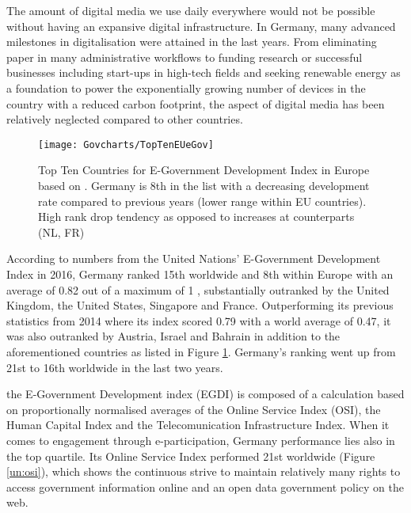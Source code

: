 The amount of digital media we use daily everywhere would not be possible without having an expansive digital infrastructure.
In Germany, many advanced milestones in digitalisation were attained in the last years. From eliminating paper in many administrative workflows 
to funding research or successful businesses including start-ups in high-tech fields %
and seeking renewable energy as a foundation %
to power the exponentially growing number of devices in the country with a reduced carbon footprint, the aspect of digital media has been relatively neglected compared to other countries. 


\begin{figure}[H]
	\caption[E-Government Development Index in Europe]{Top Ten Countries for E-Government Development Index in Europe based on \cite{un:egovReport}. Germany is 8th in the list with a decreasing development rate compared to previous years (lower range within EU countries). High rank drop tendency as opposed to increases at counterparts (NL, FR)} %
	\label{un:egci}
	\texttt{[image: Govcharts/TopTenEUeGov]} 
\end{figure}

According to numbers from the United Nations' E-Government Development Index in 2016, Germany ranked 15th worldwide and 8th within Europe with an average of 0.82 out of a maximum of 1 %
, substantially outranked by the United Kingdom, the United States, Singapore and France. Outperforming its previous statistics from 2014 where its index scored  0.79 with a world average of 0.47, it was also outranked by Austria, Israel and Bahrain \cite{freiheit:digitalisierung} in addition to the aforementioned countries as listed in Figure \ref{un:egci}.  Germany's ranking went up from 21st to 16th worldwide in the last two years.



the E-Government Development index (EGDI) is composed of a calculation based on proportionally normalised averages of the Online Service Index (OSI), the Human Capital Index and the Telecomunication Infrastructure Index. 
When it comes to engagement through e-participation, Germany performance lies also in the top quartile. Its Online Service Index performed 21st worldwide (Figure \ref{un:osi}), which shows the continuous strive to maintain relatively many rights to access government information online and an open data government policy on the web.

